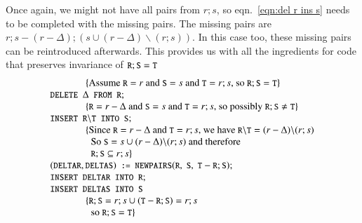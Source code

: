 \documentclass{elsarticle}
\begin{document}
	Once again, we might not have all pairs from $r;s$,
	so eqn.~\ref{eqn:del r ins s} needs to be completed with the missing pairs.
	The missing pairs are $r;s-(r-\Delta);(s\cup(r-\Delta)\backslash(r;s))$.
	In this case too, these missing pairs can be reintroduced afterwards.
	This provides us with all the ingredients for code that preserves invariance of $\text{\tt\small R};\text{\tt\small S}=\text{\tt\small T}$
\[\begin{array}{l}
\hspace{0.5in}\{\text{Assume }\code{R}=r\text{ and }\code{S}=s\text{ and }\code{T}=r;s\text{, so }\code{R};\code{S}=\code{T}\}\\
\code{DELETE }\Delta\code{ FROM R};\\
\hspace{0.5in}\{\code{R}=r-\Delta\text{ and }\code{S}=s\text{ and }\code{T}=r;s\text{, so possibly }\code{R};\code{S}\neq\code{T}\}\\
\code{INSERT R}\backslash\code{T INTO S};\\
\hspace{0.5in}\{\text{Since }\code{R}=r-\Delta\text{ and }\code{T}=r;s\text{, we have }\code{R}\backslash\code{T}=(r-\Delta)\backslash(r;s)\\
\hspace{0.575in}\text{So }\code{S}=s\cup(r-\Delta)\backslash(r;s)\text{ and therefore}\\
\hspace{0.575in}\code{R};\code{S}\subs r;s\}\\
(\code{DELTAR},\code{DELTAS})\code{ := }\code{NEWPAIRS}(\code{R},\ \code{S},\ \code{T}-\code{R};\code{S});\\
\code{INSERT DELTAR INTO R};\\
\code{INSERT DELTAS INTO S}\\
\hspace{0.5in}\{\code{R};\code{S}=r;s\cup(\code{T}-\code{R};\code{S})=r;s\\
\hspace{0.575in}\text{so }\code{R};\code{S}=\code{T}\}
\end{array}\]
\end{document}
